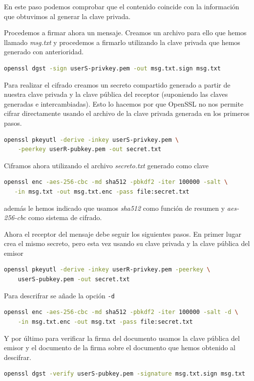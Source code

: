 \documentclass{article}
\begin{document}
En este paso podemos comprobar  que el contenido coincide con la información que
obtuvimos al generar la clave privada.

Procedemos a firmar ahora un mensaje. Creamos un archivo para ello que hemos
llamado \textit{msg.txt} y procedemos a firmarlo utilizando la clave privada que
hemos generado con anterioridad.

\begin{lstlisting}[language=bash]
  openssl dgst -sign userS-privkey.pem -out msg.txt.sign msg.txt
\end{lstlisting}

Para realizar el cifrado creamos un secreto compartido generado a partir de nuestra clave
privada y la clave pública del receptor (suponiendo las claves generadas e intercambiadas). Esto lo hacemos por que OpenSSL no nos permite cifrar directamente
usando el archivo de la clave privada generada en los primeros pasos.

\begin{lstlisting}[language=bash]
  openssl pkeyutl -derive -inkey userS-privkey.pem \
    -peerkey userR-pubkey.pem -out secret.txt
\end{lstlisting}

Ciframos ahora utilizando el archivo \textit{secreto.txt} generado como clave

\begin{lstlisting}[language=bash]
  openssl enc -aes-256-cbc -md sha512 -pbkdf2 -iter 100000 -salt \
   -in msg.txt -out msg.txt.enc -pass file:secret.txt
\end{lstlisting}

además le hemos indicado que usamos \textit{sha512} como función de resumen y
\textit{aes-256-cbc} como sistema de cifrado.

Ahora el receptor del mensaje debe seguir los siguientes pasos. En
primer lugar crea el mismo secreto, pero esta vez usando su clave privada y la clave pública del emisor

\begin{lstlisting}[language=bash]
  openssl pkeyutl -derive -inkey userR-privkey.pem -peerkey \
    userS-pubkey.pem -out secret.txt
\end{lstlisting}

Para descrifrar se añade la opción \texttt{-d}

\begin{lstlisting}[language=bash]
  openssl enc -aes-256-cbc -md sha512 -pbkdf2 -iter 100000 -salt -d \
    -in msg.txt.enc -out msg.txt -pass file:secret.txt
\end{lstlisting}

Y por último para verificar la firma del documento usamos la clave pública del emisor y el documento de la firma sobre el documento que hemos
obtenido al descifrar.

\begin{lstlisting}[language=bash]
  openssl dgst -verify userS-pubkey.pem -signature msg.txt.sign msg.txt
\end{lstlisting}
\end{document}
